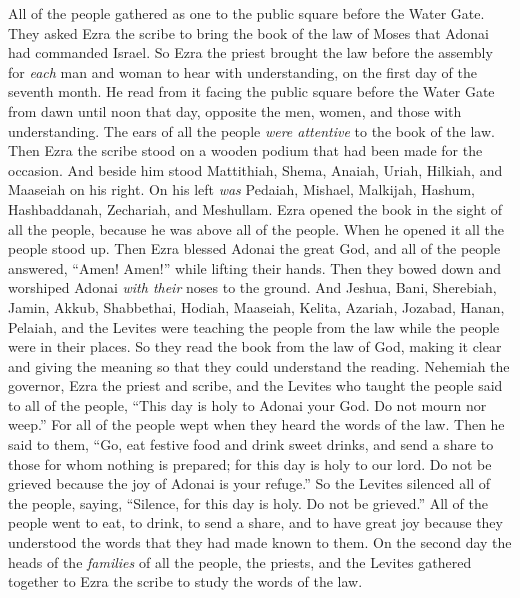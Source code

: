 \begin{biblechapter} %
 All of the people gathered as one to the public square before the Water Gate. They asked Ezra the scribe to bring the book of the law of Moses that Adonai had commanded Israel.
\verse So Ezra the priest brought the law before the assembly for \textit{each} man and woman to hear with understanding, on the first day of the seventh month.
\verse He read from it facing the public square before the Water Gate from dawn until noon that day, opposite the men, women, and those with understanding. The ears of all the people \textit{were attentive} to the book of the law.
\verse Then Ezra the scribe stood on a wooden podium that had been made for the occasion. And beside him stood Mattithiah, Shema, Anaiah, Uriah, Hilkiah, and Maaseiah on his right. On his left \textit{was} Pedaiah, Mishael, Malkijah, Hashum, Hashbaddanah, Zechariah, and Meshullam.
\verse Ezra opened the book in the sight of all the people, because he was above all of the people. When he opened it all the people stood up.
\verse Then Ezra blessed Adonai the great God, and all of the people answered, “Amen! Amen!” while lifting their hands. Then they bowed down and worshiped Adonai \textit{with their} noses to the ground.
\verse And Jeshua, Bani, Sherebiah, Jamin, Akkub, Shabbethai, Hodiah, Maaseiah, Kelita, Azariah, Jozabad, Hanan, Pelaiah, and the Levites were teaching the people from the law while the people were in their places.
\verse So they read the book from the law of God, making it clear and giving the meaning so that they could understand the reading.
\verse Nehemiah the governor, Ezra the priest and scribe, and the Levites who taught the people said to all of the people, “This day is holy to Adonai your God. Do not mourn nor weep.” For all of the people wept when they heard the words of the law.
\verse Then he said to them, “Go, eat festive food and drink sweet drinks, and send a share to those for whom nothing is prepared; for this day is holy to our lord. Do not be grieved because the joy of Adonai is your refuge.”
\verse So the Levites silenced all of the people, saying, “Silence, for this day is holy. Do not be grieved.”
\verse All of the people went to eat, to drink, to send a share, and to have great joy because they understood the words that they had made known to them.
 On the second day the heads of the \textit{families} of all the people, the priests, and the Levites gathered together to Ezra the scribe to study the words of the law.

\end{biblechapter}
